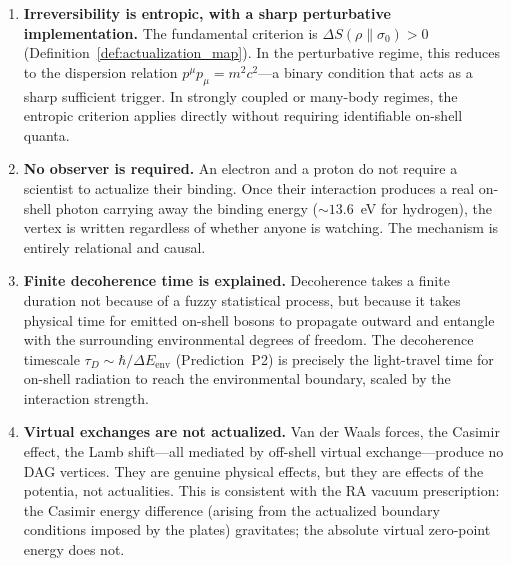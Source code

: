 \documentclass[11pt,a4paper]{article}
\theoremstyle{plain}
\theoremstyle{definition}
\theoremstyle{remark}
\begin{document}
\begin{enumerate}[leftmargin=*]
  \item \textbf{Irreversibility is entropic, with a sharp perturbative
  implementation.} The fundamental criterion is $\Delta S(\rho\|\sigma_0) > 0$
  (Definition~\ref{def:actualization_map}). In the perturbative regime, this
  reduces to the dispersion relation $p^{\mu}p_{\mu} = m^{2}c^{2}$---a binary
  condition that acts as a sharp sufficient trigger. In strongly coupled or
  many-body regimes, the entropic criterion applies directly without requiring
  identifiable on-shell quanta.

  \item \textbf{No observer is required.} An electron and a proton do not require
  a scientist to actualize their binding. Once their interaction produces a real
  on-shell photon carrying away the binding energy ($\sim 13.6$~eV for hydrogen),
  the vertex is written regardless of whether anyone is watching. The mechanism
  is entirely relational and causal.

  \item \textbf{Finite decoherence time is explained.} Decoherence takes a finite
  duration not because of a fuzzy statistical process, but because it takes
  physical time for emitted on-shell bosons to propagate outward and entangle with
  the surrounding environmental degrees of freedom. The decoherence timescale
  $\tau_D \sim \hbar / \Delta E_{\mathrm{env}}$ (Prediction~P2) is precisely the
  light-travel time for on-shell radiation to reach the environmental boundary,
  scaled by the interaction strength.

  \item \textbf{Virtual exchanges are not actualized.} Van der Waals forces, the
  Casimir effect, the Lamb shift---all mediated by off-shell virtual
  exchange---produce no DAG vertices. They are genuine physical effects, but they
  are effects of the potentia, not actualities. This is consistent with the RA
  vacuum prescription: the Casimir energy difference (arising from the actualized
  boundary conditions imposed by the plates) gravitates; the absolute virtual
  zero-point energy does not.
\end{enumerate}
\end{document}
